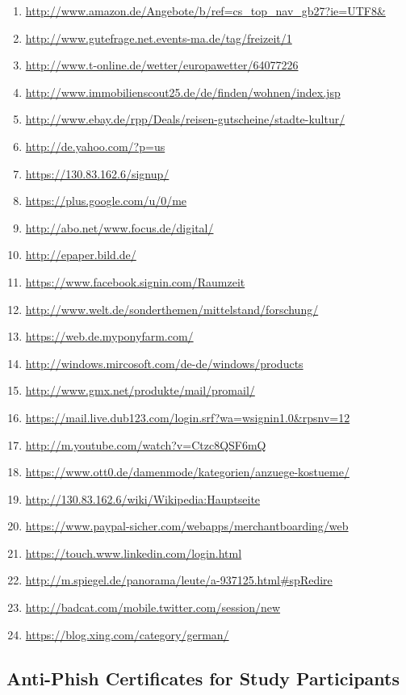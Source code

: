 \begin{enumerate}
\item \url{http://www.amazon.de/Angebote/b/ref=cs_top_nav_gb27?ie=UTF8&}
\item \url{http://www.gutefrage.net.events-ma.de/tag/freizeit/1}
\item \url{http://www.t-online.de/wetter/europawetter/64077226}
\item \url{http://www.immobilienscout25.de/de/finden/wohnen/index.jsp}
\item \url{http://www.ebay.de/rpp/Deals/reisen-gutscheine/stadte-kultur/}
\item \url{http://de.yahoo.com/?p=us}
\item \url{https://130.83.162.6/signup/}
\item \url{https://plus.google.com/u/0/me}
\item \url{http://abo.net/www.focus.de/digital/}
\item \url{http://epaper.bild.de/}
\item \url{https://www.facebook.signin.com/Raumzeit}
\item \url{http://www.welt.de/sonderthemen/mittelstand/forschung/}
\item \url{https://web.de.myponyfarm.com/}
\item \url{http://windows.mircosoft.com/de-de/windows/products}
\item \url{http://www.gmx.net/produkte/mail/promail/}
\item \url{https://mail.live.dub123.com/login.srf?wa=wsignin1.0&rpsnv=12}
\item \url{http://m.youtube.com/watch?v=Ctzc8QSF6mQ}
\item \url{https://www.ott0.de/damenmode/kategorien/anzuege-kostueme/}
\item \url{http://130.83.162.6/wiki/Wikipedia:Hauptseite}
\item \url{https://www.paypal-sicher.com/webapps/merchantboarding/web}
\item \url{https://touch.www.linkedin.com/login.html}
\item \url{http://m.spiegel.de/panorama/leute/a-937125.html#spRedire}
\item \url{http://badcat.com/mobile.twitter.com/session/new}
\item \url{https://blog.xing.com/category/german/}
\end{enumerate}



\subsection{Anti-Phish Certificates for Study Participants}
\label{s:antiphish_certs}




